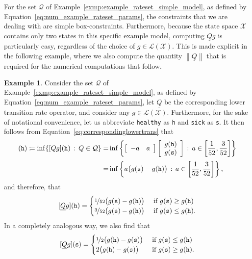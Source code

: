 \documentclass[10pt,a4paper]{paper}
\theoremstyle{definition}
\newtheorem{exmp}{Example}
\newcommand{\states}{\mathcal{X}}
\newcommand{\gambles}{\mathcal{L}}
\newcommand{\gamblesX}{\gambles(\states)}
\newcommand{\rateset}{\mathcal{Q}}
\newcommand{\lrate}{\underline{Q}}
\newcommand{\norm}[1]{\left\lVert #1 \right\rVert}
\newcommand{\coloneqq}{:\!=}
\begin{document}
For the set $\rateset$ of Example~\ref{exmp:example_rateset_simple_model}, as defined by Equation~\eqref{eq:num_example_rateset_params}, the constraints that we are dealing with are simple box-constraints. Furthermore, because the state space $\states$ contains only two states in this specific example model, computing $\lrate g$ is particularly easy, regardless of the choice of $g\in\gamblesX$. This is made explicit in the following example, where we also compute the quantity $\norm{\lrate}$ that is required for the numerical computations that follow.

\begin{exmp}\label{exmp:numerical_lrate}
Consider the set $\rateset$ of Example~\ref{exmp:example_rateset_simple_model}, as defined by Equation~\eqref{eq:num_example_rateset_params}, let $\lrate$ be the corresponding lower transition rate operator, and consider any $g\in\gamblesX$. Furthermore, for the sake of notational convenience, let us abbreviate {\tt healthy} as {\tt h} and {\tt sick} as {\tt s}. It then follows from Equation~\eqref{eq:correspondinglowertrans} that
\begin{align*}
[\lrate g](\text{{\tt h}})
\coloneqq
\inf\{[Qg](\text{{\tt h}})\,:\,Q\in\rateset\}
=&
\inf\left\{\left[\begin{array}{rr}-a & a \end{array}\right]\left[\begin{array}{l} g(\text{{\tt h}}) \\ g(\text{{\tt s}}) \end{array}\right]\,:\,a\in\left[\frac{1}{52}, \frac{3}{52} \right]\right\} \\[2pt]
=&\inf\left\{a\big(g(\text{{\tt s}})-g(\text{{\tt h}})\big)\,:\,a\in\left[\frac{1}{52}, \frac{3}{52} \right]\right\},
\vspace{-6pt}
\end{align*}
and therefore, that
\begin{equation}\label{eq:lratehealthexample:h}
[\lrate g](\text{{\tt h}})
=
\begin{cases}
\nicefrac{1}{52}\big(g(\text{{\tt s}})-g(\text{{\tt h}})\big)
&\text{ if $g(\text{{\tt s}})\geq g(\text{{\tt h}})$}\\
\nicefrac{3}{52}\big(g(\text{{\tt s}})-g(\text{{\tt h}})\big)
&\text{ if $g(\text{{\tt s}})\leq g(\text{{\tt h}})$}.
\end{cases}
\end{equation}
In a completely analogous way, we also find that
\begin{equation}\label{eq:lratehealthexample:s}
[\lrate g](\text{{\tt s}})
=
\begin{cases}
\nicefrac{1}{2}\big(g(\text{{\tt h}})-g(\text{{\tt s}})\big)
&\text{ if $g(\text{{\tt s}})\leq g(\text{{\tt h}})$}\\
2\big(g(\text{{\tt h}})-g(\text{{\tt s}})\big)
&\text{ if $g(\text{{\tt s}})\geq g(\text{{\tt h}})$}.
\end{cases}
\end{equation}


\end{exmp}
\end{document}
